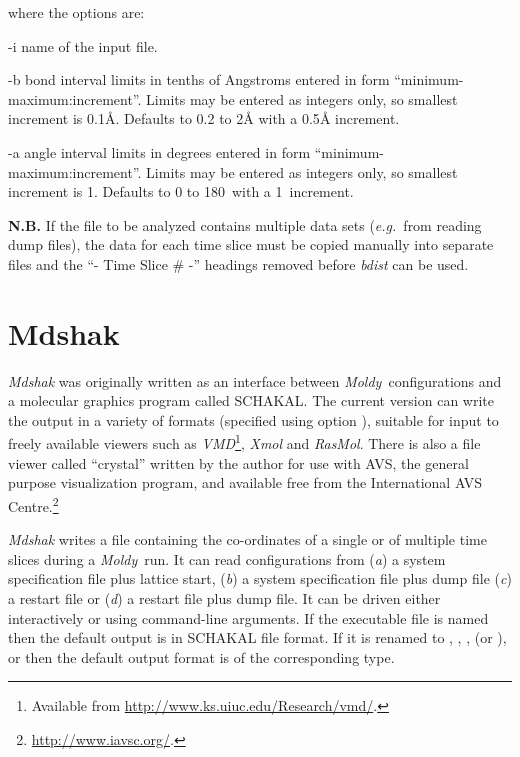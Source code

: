 \documentclass[a4paper,twoside]{report}
\newcommand{\moldy}{\emph{Moldy}}
\newcommand{\eg}{\emph{e.g.}}
\begin{document}
where the options are:
\begin{Argdescription}
\item[-i] name of the input file.
\item[-b] bond interval limits in tenths of Angstroms entered in form
  ``minimum-maximum:increment''. Limits may be entered as integers
  only, so smallest increment is 0.1{\AA}. Defaults to 0.2 to 2{\AA} with
  a 0.5{\AA} increment.
\item[-a] angle interval limits in degrees entered in form
  ``minimum-maximum:increment''. Limits may be entered as integers only,
  so smallest increment is 1{\textdegree}. Defaults to 0 to
  180{\textdegree}\ with a 1{\textdegree}\ increment.
\end{Argdescription}

\textbf{N.B.} If the file to be analyzed contains
multiple data sets (\eg\ from reading dump files), the data for each time slice
must be copied manually into separate files and the ``- Time Slice \# -''
headings removed before \emph{bdist} can be used.

\section{Mdshak}%
\emph{Mdshak} was originally written as an interface between \moldy\ 
configurations and a molecular graphics program called
SCHAKAL\cite{schakal:88}.  The current version can write the output in
a variety of formats (specified using option \Lit{-f}), suitable
for input to freely available viewers such as
\emph{VMD}\footnote{Available from
  \url{http://www.ks.uiuc.edu/Research/vmd/}.}, \emph{Xmol} and
\emph{RasMol}.  There is also a file viewer called
``crystal'' written by the author for use with AVS, the general
purpose visualization program, and available free from the
International AVS Centre.\footnote{\url{http://www.iavsc.org/}.}

\emph{Mdshak} writes a file containing the co-ordinates of a
single or of multiple time slices during a \moldy\ run.  It can read
configurations from (\emph{a}) a system specification file plus
lattice start, (\emph{b}) a system specification file plus dump file
(\emph{c}) a restart file or (\emph{d}) a restart file plus dump file.
It can be driven either interactively or using command-line arguments.
If the executable file is named \Fname{mdshak} then the default output
is in SCHAKAL file format. If it is renamed to \Fname{mdxyz},
, ,  (or ),
\Fname{mdarc} or \Fname{mdxtl} then the default output format
is of the corresponding type.
\end{document}
